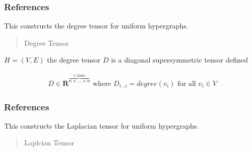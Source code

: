 \documentclass[letterpaper,10pt,english]{sphinxmanual}
\begin{document}
\begin{fulllineitems}
\begin{fulllineitems}
\subsubsection*{References}

\end{fulllineitems}


\begin{fulllineitems}
\label{\detokenize{HAT:HAT.Hypergraph.Hypergraph.degreeTensor}}
\pysigstartsignatures
{}
\pysigstopsignatures
\sphinxAtStartPar
This constructs the degree tensor for uniform hypergraphs.
\begin{quote}\begin{description}
\sphinxAtStartPar
Degree Tensor

\sphinxAtStartPar
{}

\end{description}\end{quote}
\begin{description}
\sphinxAtStartPar
\(H=(V,E)\) the degree tensor \(D\) is a diagonal supersymmetric tensor defined

\end{description}
\begin{equation*}
\begin{split}D \in \mathbf{R}^{ \overbrace{n \times \dots \times n}^{k \text{ times}}} \text{ where }{D}_{i\dots i} = degree(v_i) \text{ for all } v_i\in V\end{split}
\end{equation*}\subsubsection*{References}

\end{fulllineitems}


\begin{fulllineitems}
\label{\detokenize{HAT:HAT.Hypergraph.Hypergraph.laplacianTensor}}
\pysigstartsignatures
{}
\pysigstopsignatures
\sphinxAtStartPar
This constructs the Laplacian tensor for uniform hypergraphs.
\begin{quote}\begin{description}
\sphinxAtStartPar
Laplcian Tensor


\end{description}
\end{quote}
\end{fulllineitems}
\end{fulllineitems}
\end{document}
